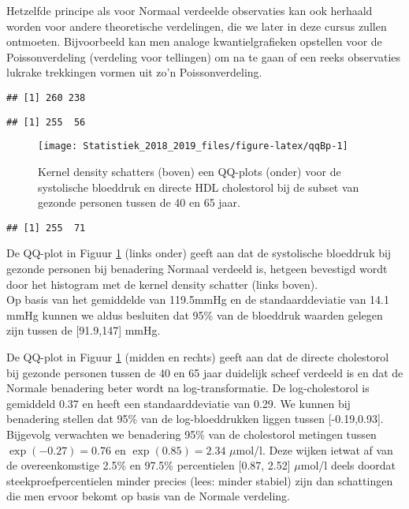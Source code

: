 \documentclass[12pt,dutch,coursenotes]{book}
\theoremstyle{definition}
\theoremstyle{definition}
\theoremstyle{definition}
\theoremstyle{remark}
\let\BeginKnitrBlock\begin \let\EndKnitrBlock\end
\begin{document}
Hetzelfde principe als voor Normaal verdeelde observaties kan ook
herhaald worden voor andere theoretische verdelingen, die we later in
deze cursus zullen ontmoeten. Bijvoorbeeld kan men analoge
kwantielgrafieken opstellen voor de Poissonverdeling (verdeling voor
tellingen) om na te gaan of een reeks observaties lukrake trekkingen
vormen uit zo'n Poissonverdeling.

\BeginKnitrBlock{example}[NHANES vervolg]
\protect\hypertarget{exm:unnamed-chunk-54}{}{\label{exm:unnamed-chunk-54}
\iffalse (NHANES vervolg) \fi{} }
\EndKnitrBlock{example}

\begin{verbatim}
## [1] 260 238
\end{verbatim}

\begin{verbatim}
## [1] 255  56
\end{verbatim}

\begin{figure}

{\centering \texttt{[image: Statistiek\_2018\_2019\_files/figure-latex/qqBp-1]} 

}

\caption{Kernel density schatters (boven) een QQ-plots (onder) voor de systolische bloeddruk en directe HDL cholestorol bij de subset van gezonde personen tussen de 40 en 65 jaar.}\label{fig:qqBp}
\end{figure}

\begin{verbatim}
## [1] 255  71
\end{verbatim}

De QQ-plot in Figuur \ref{fig:qqBp} (links onder) geeft aan dat de
systolische bloeddruk bij gezonde personen bij benadering Normaal
verdeeld is, hetgeen bevestigd wordt door het histogram met de kernel
density schatter (links boven).\\
Op basis van het gemiddelde van 119.5mmHg en de standaarddeviatie van
14.1 mmHg kunnen we aldus besluiten dat 95\% van de bloeddruk waarden
gelegen zijn tussen de {[}91.9,147{]} mmHg.

De QQ-plot in Figuur \ref{fig:qqBp} (midden en rechts) geeft aan dat de
directe cholestorol bij gezonde personen tussen de 40 en 65 jaar
duidelijk scheef verdeeld is en dat de Normale benadering beter wordt na
log-transformatie. De log-cholestorol is gemiddeld 0.37 en heeft een
standaarddeviatie van 0.29. We kunnen bij benadering stellen dat 95\%
van de log-bloeddrukken liggen tussen {[}-0.19,0.93{]}. Bijgevolg
verwachten we benadering 95\% van de cholestorol metingen tussen
\(\exp(-0.27)=0.76\) en \(\exp(0.85)=2.34\) \(\mu\)mol/l. Deze wijken
ietwat af van de overeenkomstige 2.5\% en 97.5\% percentielen {[}0.87,
2.52{]} \(\mu\)mol/l deels doordat steekproefpercentielen minder precies
(lees: minder stabiel) zijn dan schattingen die men ervoor bekomt op
basis van de Normale verdeling.
\end{document}
